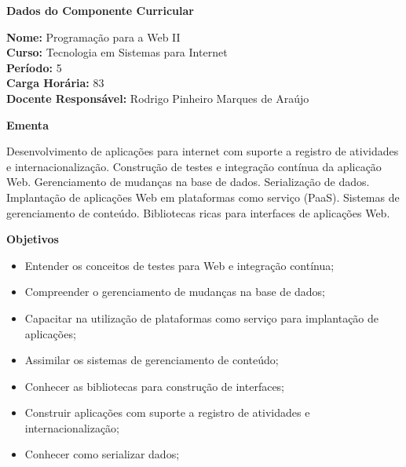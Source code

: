 

\begin{snugshade}\begin{center}\textbf{
    Dados do Componente Curricular
}\end{center}\end{snugshade}

\noindent \textbf{Nome:}                Programação para a Web II
\\        \textbf{Curso:}               Tecnologia em Sistemas para Internet
\\        \textbf{Período:}             \unit{5}{\degree}
\\        \textbf{Carga Horária:}       \unit{83}{\hour}
\\        \textbf{Docente Responsável:} Rodrigo Pinheiro Marques de Araújo


\begin{snugshade}\begin{center}\textbf{
    Ementa
\vphantom{q}}\end{center}\end{snugshade}

\noindent
Desenvolvimento de aplicações para internet com suporte a registro de atividades e internacionalização. Construção de testes e integração contínua da aplicação Web. Gerenciamento de mudanças na base de dados. Serialização de dados. Implantação de aplicações Web em plataformas como serviço (PaaS). Sistemas de gerenciamento de conteúdo. Bibliotecas ricas para interfaces de aplicações Web.



\begin{snugshade}\begin{center}\textbf{
    Objetivos
}\end{center}\end{snugshade}

\begin{itemize}

\item Entender os conceitos de testes para Web e integração contínua;

\item Compreender o gerenciamento de mudanças na base de dados;

\item Capacitar na utilização de plataformas como serviço para implantação de aplicações;

\item Assimilar os sistemas de gerenciamento de conteúdo;

\item Conhecer as bibliotecas para construção de interfaces;

\item Construir aplicações com suporte a registro de atividades e internacionalização;

\item Conhecer como serializar dados;

\end{itemize} 

